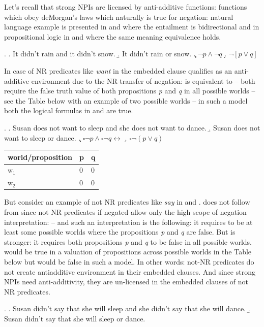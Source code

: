 \documentclass[12pt]{scrartcl}
\begin{document}
Let's recall that strong NPIs are licensed by anti-additive functions: functions which obey deMorgan's laws which naturally is true for negation: natural language example is presented in \Next[a] and \Next[b] where the entailment is bidirectional and in propositional logic in \Next[c] and \Next[d] where the same meaning equivalence holds.

\ex. \a. It didn't rain and it didn't snow. \b. It didn't rain or snow.
\c. \(\neg p \wedge \neg q\) \d. \(\neg[p \vee q]\)

In case of NR predicates like \emph{want} in \Next the embedded clause qualifies as an anti-additive environment due to the NR-transfer of negation: \Next[c] is equivalent to \Next[d] -- both require the false truth value of both propositions \textit{p} and \textit{q} in all possible worlds -- see the Table below with an example of two possible worlds -- in such a model both the logical formulas in \Next[c] and \Next[d] are true.

\ex. \a. Susan does not want to sleep and she does not want to dance.
\b. Susan does not want to sleep or dance. \c.
\(\square \neg p \wedge \square \neg q \leftrightarrow\) \d.
\(\square \neg(p \vee q)\)

\begin{longtable}[]{@{}lll@{}}
\toprule
world/proposition & p & q\tabularnewline
\midrule
\endhead
w\(_1\) & 0 & 0\tabularnewline
w\(_2\) & 0 & 0\tabularnewline
\bottomrule
\end{longtable}

But consider an example of not NR predicates like \emph{say} in \Next[a] and \Next[b]. \Next[b] does not follow from  \Next[a] since not NR predicates if negated allow only the high scope of negation interpretation: \NNext[a] -- and such an interpretation is the following: it requires to be at least some possible worlds where the propositions \textit{p} and \textit{q} are false. But \NNext[b] is stronger: it requires both propositions \textit{p} and \textit{q} to be false in all possible worlds. \NNext[a] would be true in a valuation of propositions across possible worlds in the Table below but \NNext[b] would be false in such a model. In other words: not-NR predicates do not create antiadditive environment in their embedded clauses. And since strong NPIs need anti-additivity, they are un-licensed in the embedded clauses of not NR predicates.

\ex. \a. Susan didn't say that she will sleep and she didn't say that
she will dance. \b. Susan didn't say that she will sleep or dance.
\end{document}
